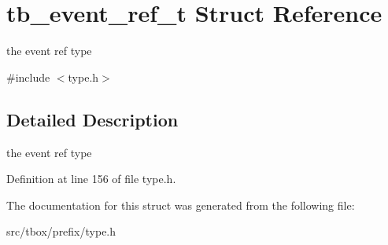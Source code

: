 \hypertarget{structtb__event__ref__t}{\section{tb\-\_\-event\-\_\-ref\-\_\-t Struct Reference}
\label{structtb__event__ref__t}
}


the event ref type  




{\ttfamily \#include $<$type.\-h$>$}



\subsection{Detailed Description}
the event ref type 

Definition at line 156 of file type.\-h.



The documentation for this struct was generated from the following file\-:\begin{DoxyCompactItemize}
\item 
src/tbox/prefix/type.\-h\end{DoxyCompactItemize}
